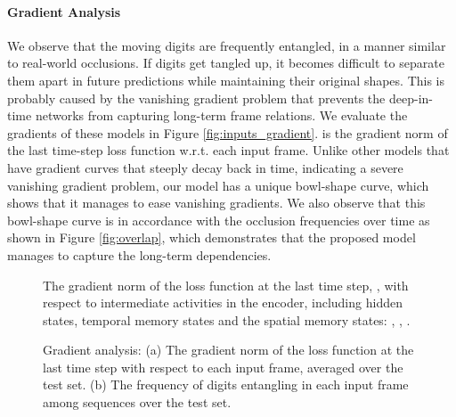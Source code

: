 \documentclass{article}
\begin{document}
\paragraph{Gradient Analysis} 

We observe that the moving digits are frequently entangled, in a manner similar to real-world occlusions. If digits get tangled up, it becomes difficult to separate them apart in future predictions while maintaining their original shapes. This is probably caused by the vanishing gradient problem that prevents the deep-in-time networks from capturing long-term frame relations. We evaluate the gradients of these models in Figure \ref{fig:inputs_gradient}.  is the gradient norm of the last time-step loss function w.r.t. each input frame. Unlike other models that have gradient curves that steeply decay back in time, indicating a severe vanishing gradient problem, our model has a unique bowl-shape curve, which shows that it manages to ease vanishing gradients. We also observe that this bowl-shape curve is in accordance with the occlusion frequencies over time as shown in Figure \ref{fig:overlap}, which demonstrates that the proposed model manages to capture the long-term dependencies. 









\begin{figure*}[htb]
\centering
{}
\caption{The gradient norm of the loss function at the last time step, , with respect to intermediate activities in the encoder, including hidden states, temporal memory states and the spatial memory states: , , .}
\label{fig:gradient2}
\end{figure*}




\begin{figure}[htb]
\centering
{}
\caption{Gradient analysis: (a) The gradient norm of the loss function at the last time step with respect to each input frame, averaged over the test set. (b) The frequency of digits entangling in each input frame among  sequences over the test set.}
\label{fig:gradient1}
\end{figure}
\end{document}
